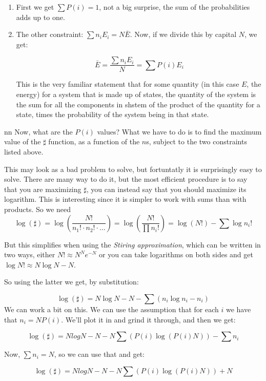 \documentclass[a4, 12pt, english, USenglish]{scrreprt}
\newcommand{\parens}[1]{\ensuremath{\left({#1}\right)}}
\newcommand{\idx}[1]{{\em #1}\index{#1}}
\begin{document}
\begin{enumerate}

\item First we get \(\sum P(i) = 1\), not a big
surprise, the sum of the probabilities adds up to one.   

\item The other constraint:  \(\sum n_i E_i = N \bar{E} \).   Now, if we divide
this by capital \(N\), we get:

\[
    \bar{E} = \frac{\sum n_i E_i}{N} = \sum P(i) E_i
\]

This is the very familiar statement that for some quantity (in this
case \(E\), the energy) for a system that is made up of states, the quantity of the
system is the sum for all the components in  shstem of the product of
the quantity for a state, times the probability of the system
being in that state.
\end{enumerate}nn
Now, what are the \(P(i)\) values?   What we have to do is to find the
maximum value of the \(\sharp\) function, as a function of the \(n\)s,
subject to the two constraints listed above. 

This may look as a bad problem to solve, but fortuntatly it is
surprisingly easy to solve.  There are many way to do it, but the most
efficient procedure is to say that you are maximizing \(\sharp\), you
can instead say that you should maximize its logarithm.   This is
interesting since it is simpler to work with sums than with products.
So we need 
\[
\log({\sharp}) = \log\parens{\frac{N!}{n_1! \cdot n_2! \cdot \ldots}}=
\log\parens{\frac{N!}{\prod n_i!}} = \log(N!) - \sum\log n_i! 
\]

But this simplifies when using the \idx{Stiring approximation}, which
can be written in two ways, either \(N! \approx N^N e^{-N}\) or you
can take logarithms on both sides and get \(\log N! \approx N\log N -
N\).

So using the latter we get, by substitution:

\[
 \log(\sharp) = N\log N - N - \sum \parens{n_i\log n_i - n_i}
\]
We can work a bit on this. We can use the assumption that for each
\(i\) we have that \(n_i = NP(i)\).  We'll plot it in and grind it
through, and then we get:

\[
 \log(\sharp) = N log N - N - N\sum\parens{P(i) \log\parens{P(i) N}} -\sum n_i
\]

Now, \(\sum n_i = N\), so we can use that and get:

\[
 \log(\sharp) = N log N - N - N\sum\parens{P(i) \log\parens{P(i) N}} + N
\]
\end{document}
